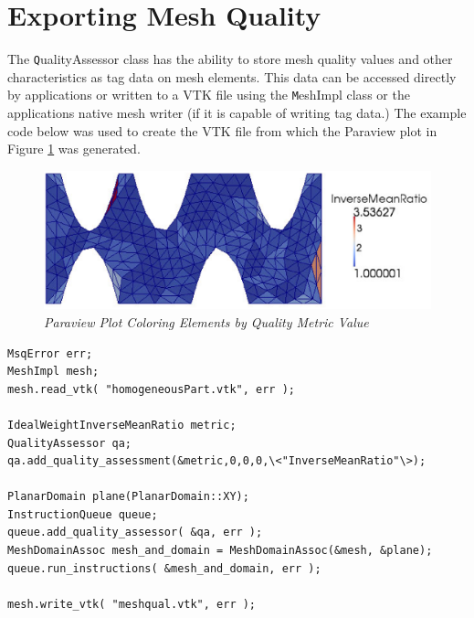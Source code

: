\section{Exporting Mesh Quality}

The {\texttt QualityAssessor} class has the ability to store mesh quality values and other characteristics as tag data on mesh elements.  This data can be accessed directly by applications or written to a VTK file using the {\texttt MeshImpl} class or the applications native mesh writer (if it is capable of writing tag data.)	 The example code below was used to create the VTK file from which the Paraview plot in Figure \ref{fig:meshqual} was generated.

\begin{figure}[htb!]
\begin{center}
\includegraphics[width=5in]{meshqual}
\caption{\em Paraview Plot Coloring Elements by Quality Metric Value \label{fig:meshqual}}
\end{center}
\end{figure}

\newpage
\begin{samepage}
\begin{lstlisting}[frame=single]
MsqError err;
MeshImpl mesh;
mesh.read_vtk( "homogeneousPart.vtk", err );

IdealWeightInverseMeanRatio metric;
QualityAssessor qa;
qa.add_quality_assessment(&metric,0,0,0,\<"InverseMeanRatio"\>);

PlanarDomain plane(PlanarDomain::XY);
InstructionQueue queue;
queue.add_quality_assessor( &qa, err );
MeshDomainAssoc mesh_and_domain = MeshDomainAssoc(&mesh, &plane);
queue.run_instructions( &mesh_and_domain, err );

mesh.write_vtk( "meshqual.vtk", err );
\end{lstlisting}
\end{samepage}


